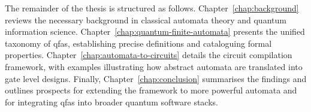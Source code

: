 The remainder of the thesis is structured as follows. Chapter~\ref{chap:background} reviews the necessary background in classical automata theory and quantum information science. Chapter~\ref{chap:quantum-finite-automata} presents the unified taxonomy of \glspl{qfa}, establishing precise definitions and cataloguing formal properties. Chapter~\ref{chap:automata-to-circuits} details the circuit compilation framework, with examples illustrating how abstract automata are translated into gate level designs. Finally, Chapter~\ref{chap:conclusion} summarises the findings and outlines prospects for extending the framework to more powerful automata and for integrating \glspl{qfa} into broader quantum software stacks.


